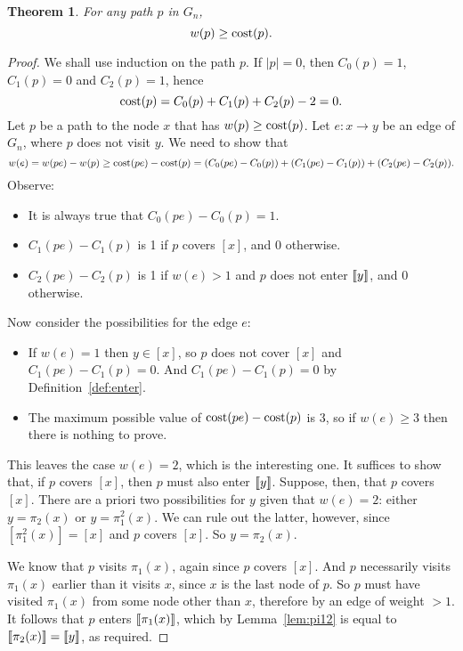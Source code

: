 \documentclass[a4paper]{article}
\newtheorem{thm}{Theorem}
\theoremstyle{definition}
\theoremstyle{remark}
\begin{document}
\begin{thm}\label{thm:cost}
    For any path $p$ in $G_n$,
    \[
        w(p) \ge \mathrm{cost}(p).
    \]
\end{thm}
\begin{proof}
    We shall use induction on the path $p$.
    If $|p|=0$, then $C_0(p)=1$, $C_1(p)=0$ and $C_2(p)=1$, hence
    \[
        \mathrm{cost}(p) = C_0(p) + C_1(p) + C_2(p) - 2 = 0.
    \]
    Let $p$ be a path to the node $x$ that has $w(p) \ge \mathrm{cost}(p)$. Let $e: x\to y$ be an edge of $G_n$, where $p$ does not visit $y$. We need to show that
    \[
        w(e) = w(pe) - w(p) \ge \mathrm{cost}(pe) - \mathrm{cost}(p) = (C_0(pe)-C_0(p)) + (C_1(pe)-C_1(p)) + (C_2(pe)-C_2(p)).
    \]
    Observe:
    \begin{itemize}
        \item It is always true that $C_0(pe)-C_0(p) = 1$.
        \item $C_1(pe)-C_1(p)$ is 1 if $p$ covers $[x]$, and 0 otherwise.
        \item $C_2(pe)-C_2(p)$ is 1 if $w(e)>1$ and $p$ does not enter $\llbracket y\rrbracket$, and 0 otherwise.
    \end{itemize}

    Now consider the possibilities for the edge $e$:
    \begin{itemize}
        \item If $w(e) = 1$ then $y\in[x]$, so $p$ does not cover $[x]$ and $C_1(pe)-C_1(p)=0$. And $C_1(pe)-C_1(p) = 0$ by Definition~\ref{def:enter}.
        \item The maximum possible value of $\mathrm{cost}(pe) - \mathrm{cost}(p)$ is 3, so if $w(e)\ge 3$ then there is nothing to prove.
    \end{itemize}
    This leaves the case $w(e)=2$, which is the interesting one. It suffices to show that, if $p$ covers $[x]$, then $p$ must also enter $\llbracket y\rrbracket$. Suppose, then, that $p$ covers $[x]$. There are a priori two possibilities for $y$ given that $w(e)=2$: either $y=\pi_2(x)$ or $y=\pi_1^2(x)$. We can rule out the latter, however, since $[\pi_1^2(x)]=[x]$ and $p$ covers $[x]$. So $y=\pi_2(x)$.

    We know that $p$ visits $\pi_1(x)$, again since $p$ covers $[x]$. And $p$ necessarily visits $\pi_1(x)$ earlier than it visits $x$, since $x$ is the last node of $p$. So $p$ must have visited $\pi_1(x)$ from some node other than $x$, therefore by an edge of weight $>1$. It follows that $p$ enters $\llbracket\pi_1(x)\rrbracket$, which by Lemma~\ref{lem:pi12} is equal to $\llbracket\pi_2(x)\rrbracket = \llbracket y\rrbracket$, as required.
\end{proof}
\end{document}
